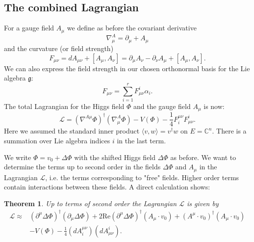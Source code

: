 \documentclass[12pt]{amsart}
\newtheorem{thm}{Theorem}[section]
\theoremstyle{definition}
\theoremstyle{remark}
\numberwithin{equation}{section}
\begin{document}
\subsection{The combined Lagrangian}
For a gauge field $A_\mu$ we define as before the covariant derivative 
\begin{equation*}
\nabla_\mu^A=\partial_\mu+A_\mu
\end{equation*}
and the curvature (or field strength)
\begin{equation*}
F_{\mu\nu}=dA_{\mu\nu}+[A_\mu,A_\nu]=\partial_\mu A_\nu-\partial_\nu A_\mu+[A_\mu,A_\nu].
\end{equation*}
We can also express the field strength in our chosen orthonormal basis for the Lie algebra $\mathfrak{g}$:
\begin{equation*}
F_{\mu\nu}=\sum_{i=1}^rF_{\mu\nu}^i\alpha_i.
\end{equation*}
The total Lagrangian for the Higgs field $\Phi$ and the gauge field $A_\mu$ is now:
\begin{equation*}
\mathcal{L}=\left(\nabla^{A\mu}\Phi\right)^\dagger\left(\nabla^A_\mu\Phi\right)-V(\Phi)-\frac{1}{4}F^{\mu\nu}_iF_{\mu\nu}^i.
\end{equation*}
Here we assumed the standard inner product $\langle v,w\rangle=v^\dagger w$ on $E=\mathbb{C}^n$. There is a summation over Lie algebra indices $i$ in the last term.

We write $\Phi=v_0+\Delta\Phi$ with the shifted Higgs field $\Delta\Phi$ as before. We want to determine the terms up to second order in the fields $\Delta\Phi$ and $A_\mu$ in the Lagrangian $\mathcal{L}$, i.e. the terms corresponding to "{}free{}" fields. Higher order terms contain interactions between these fields. A direct calculation shows:
\begin{thm}
Up to terms of second order the Lagrangian $\mathcal{L}$ is given by\begin{align*}
\mathcal{L}\approx&\left(\partial^\mu\Delta\Phi\right)^\dagger\left(\partial_\mu\Delta\Phi\right)+2\mathrm{Re}\left(\partial^\mu\Delta\Phi\right)^\dagger\left(A_\mu\cdot v_0\right)+\left(A^\mu\cdot v_0\right)^\dagger\left(A_\mu\cdot v_0\right)\\
&-V(\Phi)-\frac{1}{4}\left(dA_i^{\mu\nu}\right)\left(dA^i_{\mu\nu}\right).
\end{align*}
\end{thm}
\end{document}
